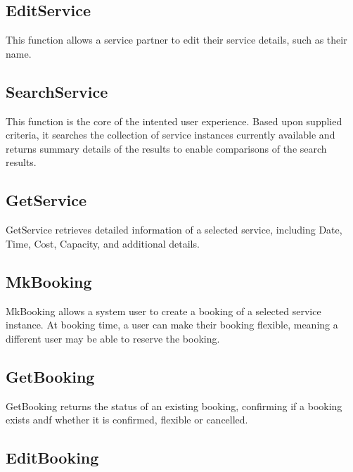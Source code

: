 \documentclass[a4paper,12pt]{article}
\begin{document}
\subsection{EditService}

This function allows a service partner to edit their service details,
such as their name.


\subsection{SearchService}

This function is the core of the intented user experience. Based upon
supplied criteria, it searches the collection of service instances 
currently available and returns summary details of the results to enable
comparisons of the search results.


\subsection{GetService}

GetService retrieves detailed information of a selected service,
including Date, Time, Cost, Capacity, and additional details.


\subsection{MkBooking}

MkBooking allows a system user to create a booking of a selected service
instance. At booking time, a user can make their booking flexible,
meaning a different user may be able to reserve the booking.


\subsection{GetBooking}

GetBooking returns the status of an existing booking, confirming if a
booking exists andf whether it is confirmed, flexible or cancelled.


\subsection{EditBooking}
\end{document}
